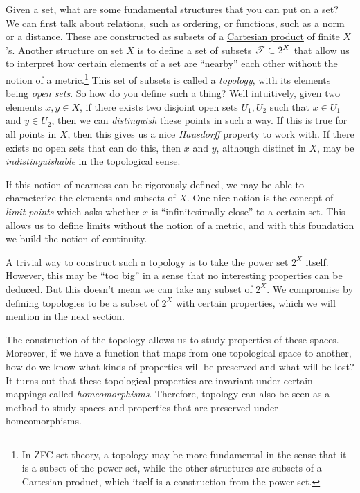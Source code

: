 Given a set, what are some fundamental structures that you can put on a set? We can first talk about relations, such as ordering, or functions, such as a norm or a distance. These are constructed as subsets of a \hyperref[st-def:cart-prod-2]{Cartesian product} of finite $X$'s. Another structure on set $X$ is to define a set of subsets $\operatorname{\mathscr{T}} \subset 2^X$ that allow us to interpret how certain elements of a set are ``nearby'' each other without the notion of a metric.\footnote{In ZFC set theory, a topology may be more fundamental in the sense that it is a subset of the power set, while the other structures are subsets of a Cartesian product, which itself is a construction from the power set.} This set of subsets is called a \textit{topology}, with its elements being \textit{open sets}. So how do you define such a thing? Well intuitively, given two elements $x, y \in X$, if there exists two disjoint open sets $U_1, U_2$ such that $x \in U_1$ and $y \in U_2$, then we can \textit{distinguish} these points in such a way. If this is true for all points in $X$, then this gives us a nice \textit{Hausdorff} property to work with. If there exists no open sets that can do this, then $x$ and $y$, although distinct in $X$, may be \textit{indistinguishable} in the topological sense. 

If this notion of nearness can be rigorously defined, we may be able to characterize the elements and subsets of $X$. One nice notion is the concept of \textit{limit points} which asks whether $x$ is ``infinitesimally close'' to a certain set. This allows us to define limits without the notion of a metric, and with this foundation we build the notion of continuity.    

A trivial way to construct such a topology is to take the power set $2^X$ itself. However, this may be ``too big'' in a sense that no interesting properties can be deduced. But this doesn't mean we can take any subset of $2^X$. We compromise by defining topologies to be a subset of $2^X$ with certain properties, which we will mention in the next section. 

The construction of the topology allows us to study properties of these spaces. Moreover, if we have a function that maps from one topological space to another, how do we know what kinds of properties will be preserved and what will be lost? It turns out that these topological properties are invariant under certain mappings called \textit{homeomorphisms}. Therefore, topology can also be seen as a method to study spaces and properties that are preserved under homeomorphisms. 
